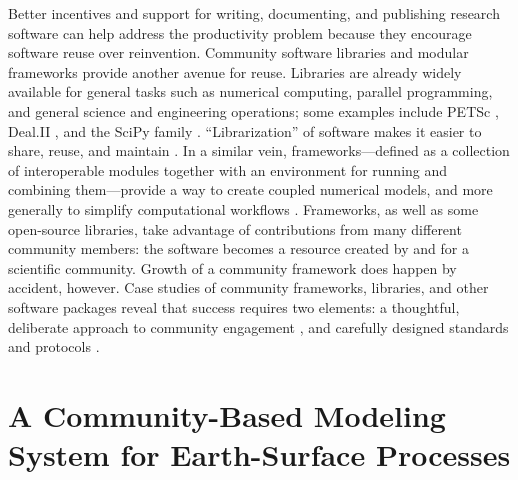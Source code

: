 \documentclass[12pt]{amsart}
\begin{document}
Better incentives and support for writing, documenting, and publishing research software can help address the productivity problem because they encourage software reuse over reinvention. Community software libraries and modular frameworks provide another avenue for reuse. Libraries are already widely available for general tasks such as numerical computing, parallel programming, and general science and engineering operations; some examples include PETSc \citep{abhyankar2018petsc}, Deal.II \citep{bangerth2007deal}, and the SciPy family \citep{2020SciPy-NMeth}. ``Librarization'' of software makes it easier to share, reuse, and maintain \citep{brown2014run}. In a similar vein, frameworks---defined as a collection of interoperable modules together with an environment for running and combining them---provide a way to create coupled numerical models, and more generally to simplify computational workflows \citep[e.g.,][]{leavesley1996modular,voinov2004modular,peckham2013component}. Frameworks, as well as some open-source libraries, take advantage of contributions from many different community members: the software becomes a resource created by and for a scientific community. Growth of a community framework does happen by accident, however. Case studies of community frameworks, libraries, and other software packages reveal that success requires two elements: a thoughtful, deliberate approach to community engagement \citep{bangerth2013makes,turk2013scaling,lawrence2015science}, and carefully designed standards and protocols \citep{peckham2013component,harpham2019introductory}.

\section{A Community-Based Modeling System for Earth-Surface Processes}
\label{sec:csdms}
\end{document}
